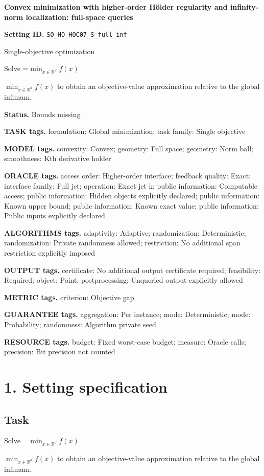 \documentclass[10pt,a4paper]{article}
\newcommand{\AtlasMath}[1]{\par\begingroup\centering\setbox0=\hbox{$\displaystyle #1$}\ifdim\wd0>1.4\linewidth\typeout{ATLAS WIDE FORMULA: \the\wd0}\fi\ifdim\wd0>\linewidth\resizebox{\linewidth}{!}{\box0}\else\box0\fi\par\endgroup}
\newcommand{\AtlasInlineMath}[1]{\begingroup\setbox0=\hbox{$#1$}\ifdim\wd0>.4\linewidth\endgroup\AtlasMath{#1}\else\endgroup$#1$\fi}
\begin{document}
\raggedright

{\LARGE\bfseries\sffamily\color{AtlasNavy} Convex minimization with higher-order Hölder regularity and infinity-norm localization: full-space queries\par}\vspace{5pt}
\textbf{Setting ID.} \texttt{SO\_\allowbreak{}HO\_\allowbreak{}HOC07\_\allowbreak{}S\_\allowbreak{}full\_\allowbreak{}inf}

Single-objective optimization

Solve \AtlasInlineMath{\min_{x\in \mathbb{R}^d}f(x)} to obtain an objective-value approximation relative to the global infimum.

\textbf{Status.} Bounds missing

\textbf{TASK tags.} formulation: Global minimization; task family: Single objective

\textbf{MODEL tags.} convexity: Convex; geometry: Full space; geometry: Norm ball; smoothness: Kth derivative holder

\textbf{ORACLE tags.} access order: Higher-order interface; feedback quality: Exact; interface family: Full jet; operation: Exact jet k; public information: Computable access; public information: Hidden objects explicitly declared; public information: Known upper bound; public information: Known exact value; public information: Public inputs explicitly declared

\textbf{ALGORITHMS tags.} adaptivity: Adaptive; randomization: Deterministic; randomization: Private randomness allowed; restriction: No additional span restriction explicitly imposed

\textbf{OUTPUT tags.} certificate: No additional output certificate required; feasibility: Required; object: Point; postprocessing: Unqueried output explicitly allowed

\textbf{METRIC tags.} criterion: Objective gap

\textbf{GUARANTEE tags.} aggregation: Per instance; mode: Deterministic; mode: Probability; randomness: Algorithm private seed

\textbf{RESOURCE tags.} budget: Fixed worst-case budget; measure: Oracle calls; precision: Bit precision not counted

\section{1. Setting specification}
\subsection{Task}
Solve \AtlasInlineMath{\min_{x\in \mathbb{R}^d}f(x)} to obtain an objective-value approximation relative to the global infimum.
\end{document}
